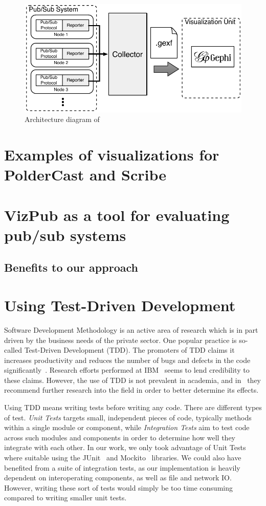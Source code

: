 \begin{figure}
\includegraphics[width=\linewidth]{figures/arch}
\caption{Architecture diagram of \demo}
\label{fig:arch}
\end{figure}
\section{Examples of visualizations for PolderCast and Scribe}
\section{VizPub as a tool for evaluating pub/sub systems }
\subsection{Benefits to our approach}

\section{Using Test-Driven Development}

Software Development Methodology is an active area of research
which is in part driven by the business needs of the private
sector\cite{janzen2005test}. One popular practice is so-called Test-Driven
Development (TDD). The promoters of TDD claims it increases
productivity and reduces the number of bugs and defects in the
code significantly~\cite{beck2003test}. Research
efforts performed at IBM~\cite{maximilien2003assessing} seems to
lend credibility to these claims. However, the use of TDD is not
prevalent in academia, and in~\cite{janzen2005test} they
recommend further research into the field in order to better
determine its effects.

Using TDD means writing tests before writing any code. There are
different types of test. \emph{Unit Tests} targets small,
independent pieces of code, typically methods within a single
module or component, while \emph{Integration Tests} aim to test
code across such modules and components in order to determine
how well they integrate with each other. In our work, we only
took advantage of Unit Tests where suitable using the
JUnit~\cite{junit} and Mockito~\cite{mockito} libraries.
We could also have benefited from a suite of integration tests,
as our implementation is heavily dependent on interoperating
components, as well as file and network IO\@. However, writing
these sort of tests would simply be too time consuming compared
to writing smaller unit tests.

